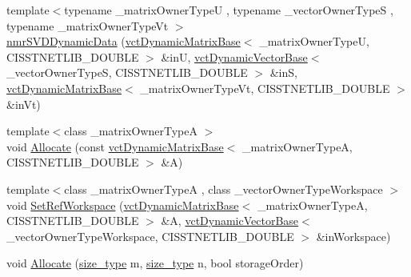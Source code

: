 \begin{DoxyCompactItemize}
\item 
{\footnotesize template$<$typename \+\_\+matrix\+Owner\+Type\+U , typename \+\_\+vector\+Owner\+Type\+S , typename \+\_\+matrix\+Owner\+Type\+Vt $>$ }\\\hyperlink{classnmr_s_v_d_dynamic_data_a366c5378160a8d0a1a4174cd21ae2692}{nmr\+S\+V\+D\+Dynamic\+Data} (\hyperlink{classvct_dynamic_matrix_base}{vct\+Dynamic\+Matrix\+Base}$<$ \+\_\+matrix\+Owner\+Type\+U, C\+I\+S\+S\+T\+N\+E\+T\+L\+I\+B\+\_\+\+D\+O\+U\+B\+L\+E $>$ \&in\+U, \hyperlink{classvct_dynamic_vector_base}{vct\+Dynamic\+Vector\+Base}$<$ \+\_\+vector\+Owner\+Type\+S, C\+I\+S\+S\+T\+N\+E\+T\+L\+I\+B\+\_\+\+D\+O\+U\+B\+L\+E $>$ \&in\+S, \hyperlink{classvct_dynamic_matrix_base}{vct\+Dynamic\+Matrix\+Base}$<$ \+\_\+matrix\+Owner\+Type\+Vt, C\+I\+S\+S\+T\+N\+E\+T\+L\+I\+B\+\_\+\+D\+O\+U\+B\+L\+E $>$ \&in\+Vt)
\item 
{\footnotesize template$<$class \+\_\+matrix\+Owner\+Type\+A $>$ }\\void \hyperlink{classnmr_s_v_d_dynamic_data_ae1d9a4869e753a1b838b14de75f1308f}{Allocate} (const \hyperlink{classvct_dynamic_matrix_base}{vct\+Dynamic\+Matrix\+Base}$<$ \+\_\+matrix\+Owner\+Type\+A, C\+I\+S\+S\+T\+N\+E\+T\+L\+I\+B\+\_\+\+D\+O\+U\+B\+L\+E $>$ \&A)
\item 
{\footnotesize template$<$class \+\_\+matrix\+Owner\+Type\+A , class \+\_\+vector\+Owner\+Type\+Workspace $>$ }\\void \hyperlink{classnmr_s_v_d_dynamic_data_a6940b17dbc208214e9cbecef8c4dd3b9}{Set\+Ref\+Workspace} (\hyperlink{classvct_dynamic_matrix_base}{vct\+Dynamic\+Matrix\+Base}$<$ \+\_\+matrix\+Owner\+Type\+A, C\+I\+S\+S\+T\+N\+E\+T\+L\+I\+B\+\_\+\+D\+O\+U\+B\+L\+E $>$ \&A, \hyperlink{classvct_dynamic_vector_base}{vct\+Dynamic\+Vector\+Base}$<$ \+\_\+vector\+Owner\+Type\+Workspace, C\+I\+S\+S\+T\+N\+E\+T\+L\+I\+B\+\_\+\+D\+O\+U\+B\+L\+E $>$ \&in\+Workspace)
\item 
void \hyperlink{classnmr_s_v_d_dynamic_data_aa65dc5751725c24564ea094609152c3b}{Allocate} (\hyperlink{classnmr_s_v_d_dynamic_data_ae1d183124f1fe39da05af9cea168101d}{size\+\_\+type} m, \hyperlink{classnmr_s_v_d_dynamic_data_ae1d183124f1fe39da05af9cea168101d}{size\+\_\+type} n, bool storage\+Order)
\item 

\end{DoxyCompactItemize}
